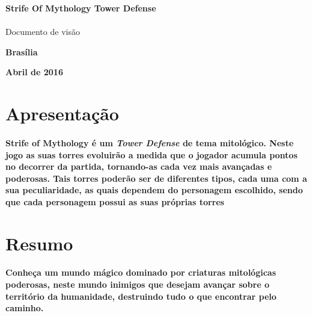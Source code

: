 \documentclass[11pt]{article} %
\begin{document}
\color{white}
\pagestyle{plain}

\begin{titlepage}
 \vfill
  \begin{center}
   {\textbf{{{\Huge  Strife Of Mythology Tower Defense}}}} \\
   \\[6cm]


   {{\huge Documento de visão}}\\[6cm]

   \hspace{.45\textwidth} %
  \vfill

\vspace{2cm}

\large \textbf{Brasília}

\large \textbf{Abril de 2016}
\end{center}
\end{titlepage}
\newpage

\color{white}
\section*{Apresentação}

\paragraph{}\textbf{Strife of Mythology é um \textit{Tower Defense} de tema mitológico. Neste jogo as suas torres evoluirão a medida que o jogador acumula pontos no decorrer da partida, tornando-as cada vez mais avançadas e poderosas. Tais torres poderão ser de diferentes tipos, cada uma com a sua peculiaridade, as quais dependem do personagem escolhido, sendo que cada personagem possui as suas próprias torres}

\section*{Resumo}

\paragraph{}\textbf{Conheça um mundo mágico dominado por criaturas mitológicas poderosas, neste mundo inimigos que desejam avançar sobre o território da humanidade, destruindo tudo o que encontrar pelo caminho.}
\end{document}

